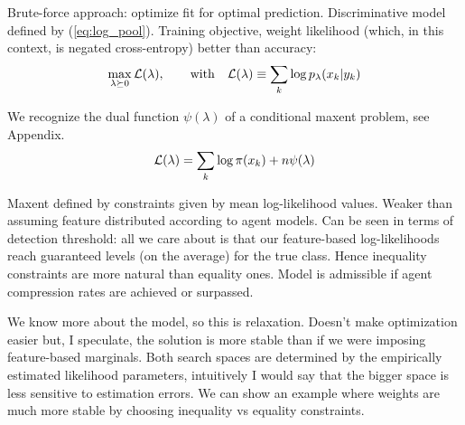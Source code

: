 \documentclass[english]{scrartcl}
\begin{document}
Brute-force approach: optimize fit for optimal prediction. Discriminative model defined by (\ref{eq:log_pool}). Training objective, weight likelihood (which, in this context, is negated cross-entropy) better than accuracy:
$$
\max_{\lambda\succeq 0} {\cal L}(\lambda),
\qquad {\rm with} \quad
{\cal L}(\lambda)\equiv\sum_k \log p_\lambda(x_k|y_k)
$$

We recognize the dual function $\psi(\lambda)$ of a conditional maxent problem, see Appendix.
$$
{\cal L}(\lambda)
= 
\sum_k \log \pi(x_k)
+ n \psi(\lambda)
$$

Maxent defined by constraints given by mean log-likelihood values. Weaker than assuming feature distributed according to agent models. Can be seen in terms of detection threshold: all we care about is that our feature-based log-likelihoods reach guaranteed levels (on the average) for the true class. Hence inequality constraints are more natural than equality ones. Model is admissible if agent compression rates are achieved or surpassed.

We know more about the model, so this is relaxation. Doesn't make optimization easier but, I speculate, the solution is more stable than if we were imposing feature-based marginals. Both search spaces are determined by the empirically estimated likelihood parameters, intuitively I would say that the bigger space is less sensitive to estimation errors. We can show an example where weights are much more stable by choosing inequality vs equality constraints.




\end{document}
